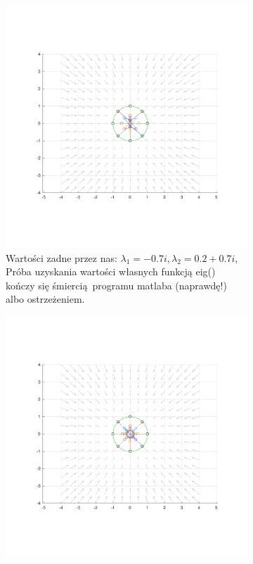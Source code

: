 \documentclass[]{article}
\begin{document}
\begin{figure}[H]
	
	\centering
	\begin{subfigure}{.5\textwidth}
		\centering
		\includegraphics[width=0.99\linewidth]{imag_ok}
		\caption{Wartości zadne przez nas: $\lambda_1 = -0.7i, \lambda_2 = 0.2 + 0.7i $, Próba uzyskania wartości własnych funkcją eig() kończy się śmiercią programu matlaba (naprawdę!) albo ostrzeżeniem.}
		\label{fig:imag2}
	\end{subfigure}
	\begin{subfigure}{.5\textwidth}
		\centering
		\includegraphics[width=0.99\linewidth]{imag_wrong}

\end{subfigure}
\end{figure}
\end{document}
